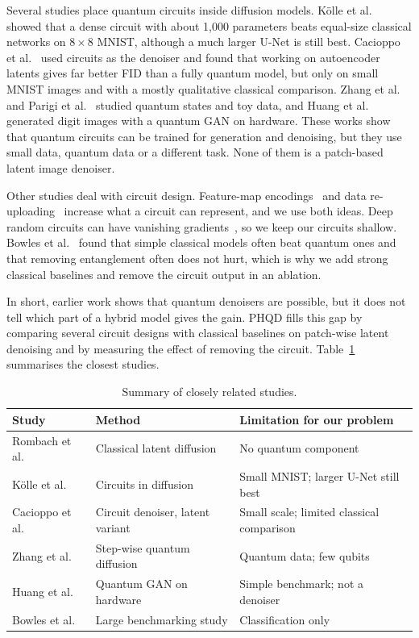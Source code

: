 \documentclass[runningheads]{llncs}
\begin{document}
Several studies place quantum circuits inside diffusion models. K\"olle et al.~\cite{kolle} showed that a dense circuit with about 1,000 parameters beats equal-size classical networks on $8\times8$ MNIST, although a much larger U-Net is still best. Cacioppo et al.~\cite{cacioppo} used circuits as the denoiser and found that working on autoencoder latents gives far better FID than a fully quantum model, but only on small MNIST images and with a mostly qualitative classical comparison. Zhang et al.~\cite{zhang} and Parigi et al.~\cite{parigi} studied quantum states and toy data, and Huang et al.~\cite{huang} generated digit images with a quantum GAN on hardware. These works show that quantum circuits can be trained for generation and denoising, but they use small data, quantum data or a different task. None of them is a patch-based latent image denoiser.

Other studies deal with circuit design. Feature-map encodings~\cite{havlicek} and data re-uploading~\cite{salinas,schuld} increase what a circuit can represent, and we use both ideas. Deep random circuits can have vanishing gradients~\cite{mcclean}, so we keep our circuits shallow. Bowles et al.~\cite{bowles} found that simple classical models often beat quantum ones and that removing entanglement often does not hurt, which is why we add strong classical baselines and remove the circuit output in an ablation.

In short, earlier work shows that quantum denoisers are possible, but it does not tell which part of a hybrid model gives the gain. PHQD fills this gap by comparing several circuit designs with classical baselines on patch-wise latent denoising and by measuring the effect of removing the circuit. Table~\ref{tab:related} summarises the closest studies.

\begin{table}[t]
\caption{Summary of closely related studies.}\label{tab:related}
\centering\scriptsize
\renewcommand{\arraystretch}{1.2}
\begin{tabular}{@{}>{\raggedright\arraybackslash}p{}>{\raggedright\arraybackslash}p{}>{\raggedright\arraybackslash}p{}@{}}
\toprule
Study & Method & Limitation for our problem\\
\midrule
Rombach et al.~\cite{rombach} & Classical latent diffusion & No quantum component\\
K\"olle et al.~\cite{kolle} & Circuits in diffusion & Small MNIST; larger U-Net still best\\
Cacioppo et al.~\cite{cacioppo} & Circuit denoiser, latent variant & Small scale; limited classical comparison\\
Zhang et al.~\cite{zhang} & Step-wise quantum diffusion & Quantum data; few qubits\\
Huang et al.~\cite{huang} & Quantum GAN on hardware & Simple benchmark; not a denoiser\\
Bowles et al.~\cite{bowles} & Large benchmarking study & Classification only\\
\bottomrule
\end{tabular}
\end{table}
\end{document}
